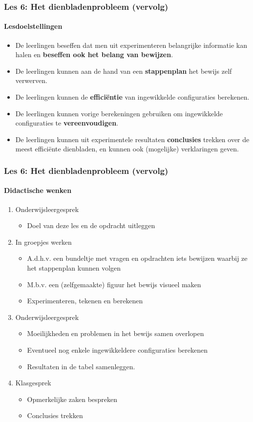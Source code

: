\documentclass[dutch]{beamer}
\begin{document}
\begin{frame}
\frametitle{Les 6: Het dienbladenprobleem {\small (vervolg)}}
\framesubtitle{Lesdoelstellingen}
\begin{itemize}
\item De leerlingen beseffen dat men uit experimenteren belangrijke informatie kan halen en \textbf{beseffen ook het belang van bewijzen}.
\item De leerlingen kunnen aan de hand van een \textbf{stappenplan} het bewijs zelf verwerven.
\item De leerlingen kunnen de \textbf{effici\"{e}ntie} van ingewikkelde configuraties berekenen.
\item De leerlingen kunnen vorige berekeningen gebruiken om ingewikkelde configuraties te \textbf{vereenvoudigen}.
\item De leerlingen kunnen uit experimentele resultaten \textbf{conclusies} trekken over de meest effici\"{e}nte dienbladen, en kunnen ook (mogelijke) verklaringen geven.
\end{itemize}
\end{frame}

\begin{frame}
\frametitle{Les 6: Het dienbladenprobleem {\small (vervolg)}}
\framesubtitle{Didactische wenken}

\begin{enumerate}
	\item Onderwijsleergesprek
	\begin{itemize}
	\item Doel van deze les en de opdracht uitleggen
\end{itemize}
	
	\item In groepjes werken
	\begin{itemize}
	\item A.d.h.v. een bundeltje met vragen en opdrachten iets bewijzen waarbij ze het stappenplan kunnen volgen
	\item M.b.v. een (zelfgemaakte) figuur het bewijs visueel maken
	\item Experimenteren, tekenen en berekenen
\end{itemize}

  \item Onderwijsleergesprek
  \begin{itemize}
  \item Moeilijkheden en problemen in het bewijs samen overlopen
  \item Eventueel nog enkele ingewikkeldere configuraties berekenen
	\item Resultaten in de tabel samenleggen.
\end{itemize}

  \item Klasgesprek
  \begin{itemize}
	  \item Opmerkelijke zaken bespreken
	  \item Conclusies trekken
  \end{itemize}
\end{enumerate}
\end{frame}
\end{document}
